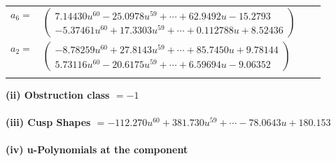 \documentclass[1p]{elsarticle_modified}
\theoremstyle{definition}
\begin{document}
\begin{tabular}{m{7pt} m{180pt} m{7pt} m{180pt} }
\flushright $a_{6}=$&$\begin{pmatrix}7.14430 u^{60}-25.0978 u^{59}+\cdots+62.9492 u-15.2793\\-5.37461 u^{60}+17.3303 u^{59}+\cdots+0.112788 u+8.52436\end{pmatrix}$ \\
\flushright $a_{2}=$&$\begin{pmatrix}-8.78259 u^{60}+27.8143 u^{59}+\cdots+85.7450 u+9.78144\\5.73116 u^{60}-20.6175 u^{59}+\cdots+6.59694 u-9.06352\end{pmatrix}$\\&\end{tabular}
\flushleft \textbf{(ii) Obstruction class $= -1$}\\~\\
\flushleft \textbf{(iii) Cusp Shapes $= -112.270 u^{60}+381.730 u^{59}+\cdots-78.0643 u+180.153$}\\~\\
\newpage\renewcommand{\arraystretch}{1}
\flushleft \textbf{(iv) u-Polynomials at the component}\newline \\
\end{document}
